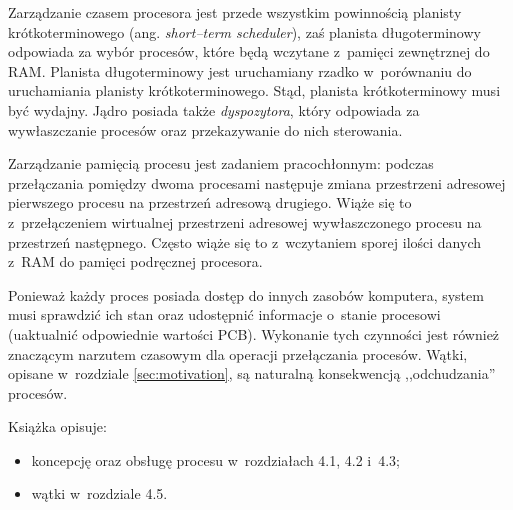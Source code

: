 \documentclass[12pt]{mwart}
\begin{document}
\par
%
\indent
  Zarządzanie czasem procesora jest przede wszystkim powinnością planisty krótkoterminowego (ang. \emph{short--term scheduler}),
  zaś planista długoterminowy odpowiada za wybór procesów, które będą wczytane z~pamięci zewnętrznej do RAM. Planista długoterminowy
  jest uruchamiany rzadko w~porównaniu do uruchamiania planisty krótkoterminowego. Stąd, planista krótkoterminowy musi być wydajny.
  Jądro posiada także \emph{dyspozytora}, który odpowiada za wywłaszczanie procesów oraz przekazywanie do nich sterowania.
\par
%
\indent
  Zarządzanie pamięcią procesu jest zadaniem pracochłonnym: podczas przełączania pomiędzy dwoma procesami następuje zmiana 
  przestrzeni adresowej pierwszego procesu na przestrzeń adresową drugiego. Wiąże się to z~przełączeniem wirtualnej przestrzeni adresowej 
  wywłaszczonego procesu na przestrzeń następnego. Często wiąże się to z~wczytaniem sporej ilości danych z~RAM do pamięci podręcznej procesora.
\par
%
\indent
  Ponieważ każdy proces posiada dostęp do innych zasobów komputera, system musi sprawdzić ich stan oraz udostępnić informacje o~stanie procesowi
  (uaktualnić odpowiednie wartości PCB). Wykonanie tych czynności jest również znaczącym narzutem czasowym dla operacji przełączania procesów.
  Wątki, opisane w~rozdziale \ref{sec:motivation}, są naturalną konsekwencją ,,odchudzania'' procesów.
\par
\indent
  Książka \cite{silberschatz} opisuje:
  \begin{itemize}
    \item koncepcję oraz obsługę procesu w~rozdziałach 4.1, 4.2 i~4.3;
    \item wątki w~rozdziale 4.5.
  \end{itemize}
\par
%
\end{document}

